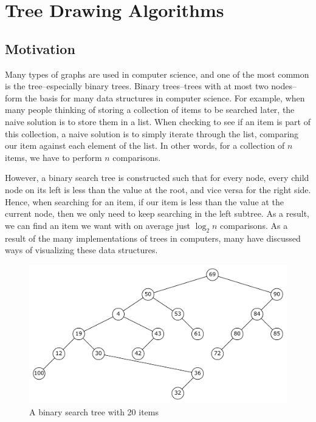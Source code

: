 \documentclass[11pt]{report}
\begin{document}
\chapter{Tree Drawing Algorithms}
\section{Motivation}
Many types of graphs are used in computer science, and one of the most common is the tree--especially binary trees. Binary trees--trees with at most two nodes--form the basis for many data structures in computer science. For example, when many people thinking of storing a collection of items to be searched later, the naive solution is to store them in a list. When checking to see if an item is part of this collection, a naive solution is to simply iterate through the list, comparing our item against each element of the list. In other words, for a collection of $n$ items, we have to perform $n$ comparisons.

\bigskip

However, a binary search tree is constructed such that for every node, every child node on its left is less than the value at the root, and vice versa for the right side. Hence, when searching for an item, if our item is less than the value at the current node, then we only need to keep searching in the left subtree. As a result, we can find an item we want with on average just $\log_2{n}$ comparisons. As a result of the many implementations of trees in computers, many have discussed ways of visualizing these data structures.

\begin{figure}[H]
    \includegraphics[width=\linewidth]{report/bst_20.pdf}
    \caption{A binary search tree with 20 items}
\end{figure}
\end{document}
